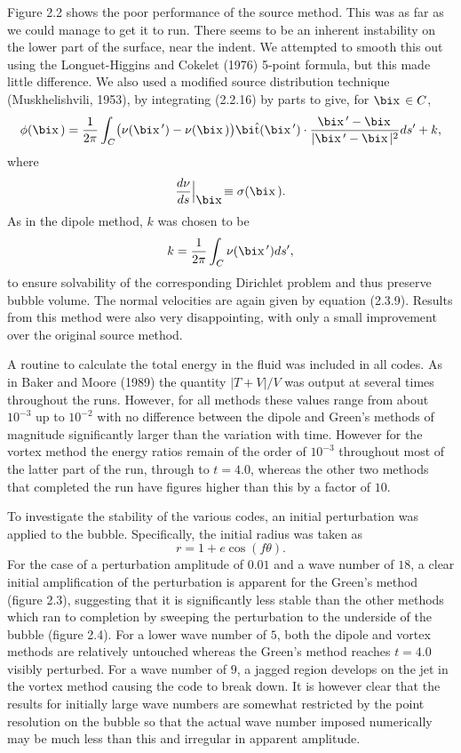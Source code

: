 Figure 2.2 shows the poor performance of the source method. 
This was as far as
we could manage to get it to run. There seems to be an inherent instability
on the lower part of the surface, near the indent. We attempted to
smooth this out using the Longuet-Higgins and Cokelet (1976) 5-point 
formula, but this
made little difference.     
We also used a modified source distribution technique (Muskhelishvili, 1953),
by integrating (2.2.16) by parts to give, for $\bd{x}\in C$,
$$\phi(\bd{x})={1\over 2\pi}\int_C\bigl(\nu(\bd{x}')
-\nu(\bd{x})\bigr)\bh{t}(\bd{x}')\cdot
{\bd{x}'-\bd{x}\over |\bd{x}'-\bd{x}|^2}ds'+k,$$
where
$${d\nu\over ds}\Bigl|_{\bd{x}}\equiv\sigma(\bd{x}).$$
As in the dipole method, $k$ was chosen to be
$$k={1\over 2\pi}\int_C\nu(\bd{x}')ds',$$
to ensure solvability of the corresponding Dirichlet problem and thus
preserve bubble volume.
The normal velocities are again given by equation (2.3.9).
Results from this method were also very disappointing,
with only a small improvement over the original source method.

A routine to calculate the total energy in the fluid was included in all 
codes.
As in Baker and Moore (1989) the quantity $|T+V|/V$ was output at several
times throughout the runs. However, for all methods these values range
from about $10^{-3}$ up to $10^{-2}$ with no difference between
the dipole and Green's methods of 
magnitude significantly larger than the variation
with time. However for the vortex method the energy
ratios remain of the order  of  $10^{-3}$  throughout
most of the
latter part of the run, through to $t=4.0$, whereas the  other  two
methods that completed the run have figures higher than this by a 
factor of $10$.

To investigate the stability of the various codes, an initial perturbation
was applied to the bubble. Specifically, the initial radius was taken as
$$r=1+e\cos(f\theta).$$
For the case of 
a perturbation amplitude of $0.01$ and a wave number of $18$, a clear initial
amplification of the perturbation is apparent for the Green's method
(figure 2.3),
suggesting that it is significantly less stable than the other methods
which ran to  completion  by  sweeping  the  perturbation  to  the
underside of the bubble (figure 2.4).
For a lower wave number of $5$, both the dipole and vortex methods are
relatively untouched whereas the  Green's method reaches  $t=4.0$ 
visibly perturbed.
For a wave number of $9$,
a jagged region develops on the jet
in the vortex method causing the code to break down. It is 
however clear that the results for initially
large wave numbers are 
somewhat restricted by the point resolution on the bubble
so that the actual wave number 
imposed numerically may be much less than this and irregular
in apparent amplitude.

